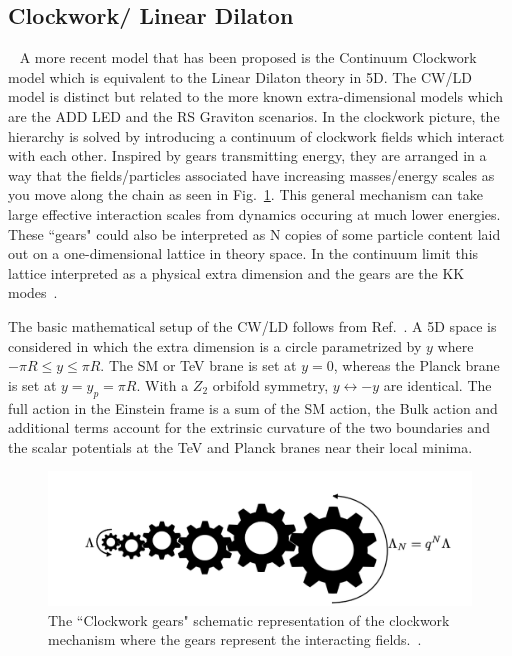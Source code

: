 \subsection{Clockwork/ Linear Dilaton}~\label{sec:CWmodel} 
A more recent model that has been proposed is the Continuum Clockwork model which is equivalent to the Linear Dilaton theory in 5D. The CW/LD model is distinct but related to the more known extra-dimensional models which are the ADD LED and the RS Graviton scenarios. In the clockwork picture, the hierarchy is solved by introducing a continuum of clockwork fields which interact with each other. Inspired by gears transmitting energy, they are arranged in a way that the fields/particles associated have increasing masses/energy scales as you move along the chain as seen in Fig.~\ref{fig:ClockworkSchematic}.
This general mechanism can take large effective interaction scales from dynamics occuring at much lower energies. These ``gears" could also be interpreted as N copies of some particle content laid out on a one-dimensional lattice in theory space. In the continuum limit this lattice interpreted as a physical extra dimension and the gears are the KK modes~\cite{2Clockwork}. 

The basic mathematical setup of the CW/LD follows from Ref.~\cite{Giudice:2017fmj}. A 5D space is considered in which the extra dimension is a circle parametrized by $y$ where $- \pi R \leq y \leq \pi R$. The SM or TeV brane is set at $y = 0 $, whereas the Planck brane is set at $y = y_p = \pi R$. With a $Z_2$ orbifold symmetry, $y\leftrightarrow-y$ are identical. The full action in the Einstein frame is a sum of the SM action, the Bulk action and additional terms account for the extrinsic curvature of the two boundaries and the scalar potentials at the TeV and Planck branes near their local minima.

\begin{figure}[ht]
    \centering
    \includegraphics[scale=0.5]{fig/ClockworkSchematic.png}
    \caption{The ``Clockwork gears" schematic representation of the clockwork mechanism where the gears represent the interacting fields.~\cite{2Clockwork}. }
    \label{fig:ClockworkSchematic}
\end{figure}

